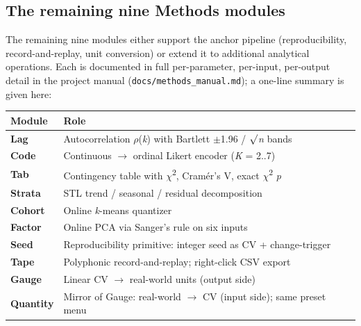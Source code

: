 \subsection{The remaining nine Methods
modules}\label{the-remaining-nine-methods-modules}

The remaining nine modules either support the anchor pipeline
(reproducibility, record-and-replay, unit conversion) or extend it to
additional analytical operations. Each is documented in full
per-parameter, per-input, per-output detail in the project manual
(\texttt{docs/methods\_manual.md}); a one-line summary is given here:

\begin{longtable}[]{@{}
  >{\raggedright\arraybackslash}p{}
  >{\raggedright\arraybackslash}p{}@{}}
\toprule\noalign{}
\begin{minipage}[b]{\linewidth}\raggedright
Module
\end{minipage} & \begin{minipage}[b]{\linewidth}\raggedright
Role
\end{minipage} \\
\midrule\noalign{}
\endhead
\bottomrule\noalign{}
\endlastfoot
\textbf{Lag} & Autocorrelation \ensuremath{\rho}(\emph{k}) with Bartlett \ensuremath{\pm}1.96 /
\ensuremath{\surd}\emph{n} bands \\
\textbf{Code} & Continuous $\rightarrow$ ordinal Likert encoder (\emph{K} = 2..7) \\
\textbf{Tab} & Contingency table with \ensuremath{\chi}\textsuperscript{2}, Cramér's V, exact \ensuremath{\chi}\textsuperscript{2} \emph{p}
\citep{press2007} \\
\textbf{Strata} & STL trend / seasonal / residual decomposition
\citep{cleveland1990} \\
\textbf{Cohort} & Online \emph{k}-means quantizer \\
\textbf{Factor} & Online PCA via Sanger's rule on six inputs
\citep{sanger1989} \\
\textbf{Seed} & Reproducibility primitive: integer seed as CV +
change-trigger \\
\textbf{Tape} & Polyphonic record-and-replay; right-click CSV export \\
\textbf{Gauge} & Linear CV $\rightarrow$ real-world units (output side) \\
\textbf{Quantity} & Mirror of Gauge: real-world $\rightarrow$ CV (input side); same
preset menu \\
\end{longtable}

